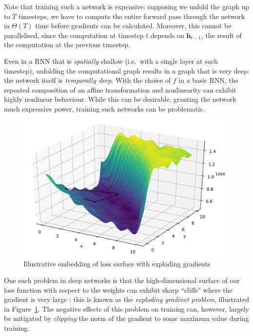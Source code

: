 \documentclass[12pt,a4paper,twoside,openright]{report}
\newcommand{\vect}[1]{\boldsymbol{\mathbf{#1}}}
\begin{document}
Note that training such a network is expensive: supposing we unfold the graph up
to $T$ timesteps, we have to compute the entire forward pass through the network
in $\Theta(T)$ time before gradients can be calculated. Moreover, this cannot be
parallelised, since the computation at timestep $t$ depends on
$\vect{h}_{t-1}$, the result of the computation at the previous timestep.

Even in a RNN that is \emph{spatially} shallow (i.e.\ with a
single layer at each timestep), unfolding the computational graph results in a
graph that is very deep: the network itself is \emph{temporally deep}. With the
choice of $f$ in a basic RNN, the repeated composition of an affine
transformation and nonlinearity can exhibit highly nonlinear behaviour. While
this can be desirable, granting the network much expressive power, training such
networks can be problematic. 

\begin{figure}[H]
\centering
\includegraphics[width=400pt]{figs/exploding_gradients.pdf}
\caption{Illustrative embedding of loss surface with exploding gradients}
\label{fig:exploding-grad}
\end{figure}

One such problem in deep networks is that the high-dimensional surface of our
loss function with respect to the weights can exhibit sharp ``cliffs'' where the
gradient is very large \cite{Goodfellow-et-al-2016}: this is known as the
\emph{exploding gradient problem}, illustrated in
Figure~\ref{fig:exploding-grad}. The negative effects of this problem on
training can, however, largely be mitigated by \emph{clipping} the norm of the
gradient to some maximum value during training.
\end{document}
